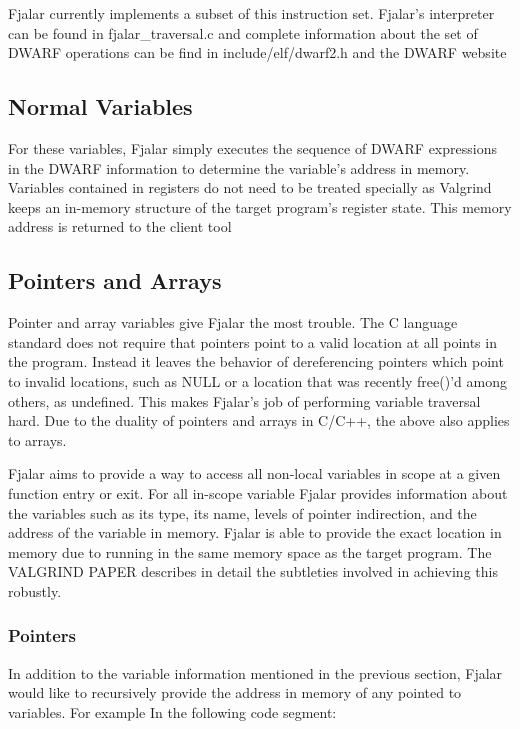 \documentclass[11pt]{article}
\begin{document}
Fjalar currently implements a subset of this instruction set. Fjalar's
interpreter can be found in fjalar\_traversal.c and complete
information about the set of DWARF operations can be find in
include/elf/dwarf2.h and the DWARF website %

\subsection{Normal Variables} %
For these variables, Fjalar simply executes the sequence of DWARF
expressions in the DWARF information to determine the variable's
address in memory. Variables contained in registers do not need to be treated
specially as Valgrind keeps an in-memory structure of the target
program's register state. This memory address is returned to the
client tool

\subsection{Pointers and Arrays}
Pointer and array variables give Fjalar the most trouble. The C
language standard does not require that pointers point to a valid
location at all points in the program. Instead it leaves the behavior
of dereferencing pointers which point to invalid locations, such as
NULL or a location that was recently free()'d among others, as
undefined. This makes Fjalar's job of performing variable traversal
hard. Due to the duality of pointers and arrays in C/C++, the above
also applies to arrays.

Fjalar aims to provide a way to access all non-local variables 
in scope at a given function entry or exit. For all in-scope variable
Fjalar provides information about the variables such as its type,
its name, levels of pointer indirection, and the address of the
variable in memory. Fjalar is able to provide the exact location in
memory due to running in the same memory space as the target
program. The VALGRIND PAPER %
describes in detail the subtleties involved in achieving this
robustly.


\subsubsection{Pointers}
In addition to the variable information mentioned in the previous
section, Fjalar would like to recursively provide the
address in memory of any pointed to variables. For example In the
following code segment:
\end{document}

